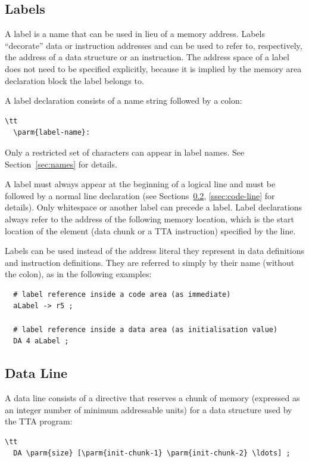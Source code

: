 \documentclass[twoside]{tceusermanual}
\begin{document}
\subsection{Labels}
\label{ssec:labels}

A label is a name that can be used in lieu of a memory address.  Labels
``decorate'' data or instruction addresses and can be used to refer to,
respectively, the address of a data structure or an instruction.
%
The address space of a label does not need to be specified explicitly,
because it is implied by the memory area declaration block the label belongs
to.

A label declaration consists of a name string followed by a colon:

\begin{verbatim}\tt
  \parm{label-name}:
\end{verbatim}

Only a restricted set of characters can appear in label names. See
Section~\ref{sec:names} for details.

A label must always appear at the beginning of a logical line and must be
followed by a normal line declaration (see Sections~\ref{ssec:data-line},
\ref{ssec:code-line} for details). Only whitespace or another label can
precede a label. Label declarations always refer to the address of the
following memory location, which is the start location of the element (data
chunk or a TTA instruction) specified by the line.

Labels can be used instead of the address literal they represent in data
definitions and instruction definitions. They are referred to simply by
their name (without the colon), as in the following examples:
\begin{verbatim}
  # label reference inside a code area (as immediate)
  aLabel -> r5 ;

  # label reference inside a data area (as initialisation value)
  DA 4 aLabel ;
\end{verbatim}

\subsection{Data Line}
\label{ssec:data-line}

A data line consists of a directive that reserves a chunk of memory
(expressed as an integer number of minimum addressable units) for a data
structure used by the TTA program:

\begin{verbatim}\tt
  DA \parm{size} [\parm{init-chunk-1} \parm{init-chunk-2} \ldots] ;
\end{verbatim}
\end{document}
